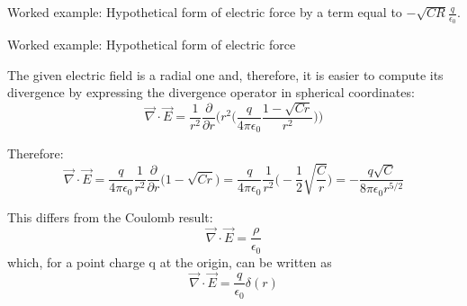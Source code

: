 {\begin{frame}{Worked example: Hypothetical form of electric force}
  by a term equal to
  $\displaystyle -\sqrt{CR} \frac{q}{\epsilon_0}$.

\end{frame}

%
%
%

\begin{frame}{Worked example: Hypothetical form of electric force}

  The given electric field is a radial one and,
  therefore, it is easier to compute its divergence by expressing
  the divergence operator in spherical coordinates:
  \begin{equation*}
    \vec{\nabla} \cdot \vec{E} =
     \frac{1}{r^2} \frac{\partial}{\partial r}
      \Bigg( r^2
        \Big(
          \frac{q}{4\pi \epsilon_0}
          \frac{1-\sqrt{Cr}}{r^2}
        \Big)
      \Bigg)
  \end{equation*}

  Therefore:
  \begin{equation*}
    \vec{\nabla} \cdot \vec{E} =
      \frac{q}{4\pi \epsilon_0}
      \frac{1}{r^2}
      \frac{\partial}{\partial r}
      \Big( 1-\sqrt{Cr} \Big) =
      \frac{q}{4\pi \epsilon_0}
      \frac{1}{r^2}
      \Big(-\frac{1}{2}\sqrt{\frac{C}{r}} \Big) =
      - \frac{q \sqrt{C}}{8\pi \epsilon_0 r^{5/2}}
  \end{equation*}

  This differs from the Coulomb result:
  \begin{equation*}
    \vec{\nabla} \cdot \vec{E} = \frac{\rho}{\epsilon_0}
  \end{equation*}
  which, for a point charge q at the origin, can be written as
  \begin{equation*}
    \vec{\nabla} \cdot \vec{E} = \frac{q}{\epsilon_0} \delta(r)
  \end{equation*}

\end{frame}

} %


%
%
%

